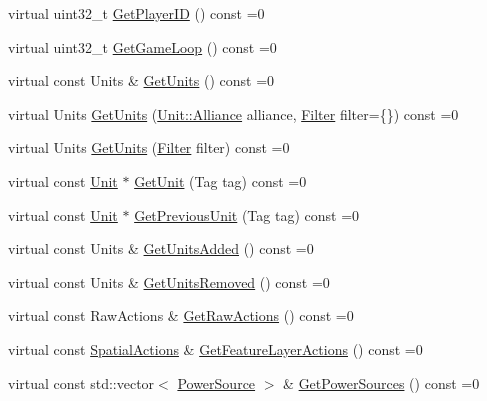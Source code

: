 \begin{DoxyCompactItemize}
\item 
virtual uint32\+\_\+t \hyperlink{classsc2_1_1_observation_interface_a21c3f197fe6578e63ef6b2eaa2be082c}{Get\+Player\+ID} () const =0
\item 
virtual uint32\+\_\+t \hyperlink{classsc2_1_1_observation_interface_a19d85546124654418d00b736f0146218}{Get\+Game\+Loop} () const =0
\item 
virtual const Units \& \hyperlink{classsc2_1_1_observation_interface_ab08e71ba04b19d3b4048ce9da6838e00}{Get\+Units} () const =0
\item 
virtual Units \hyperlink{classsc2_1_1_observation_interface_aa43cfa17a9ac893500bce33eb41e6171}{Get\+Units} (\hyperlink{classsc2_1_1_unit_a5a40e672e7599d73ef8ef5758bbd7461}{Unit\+::\+Alliance} alliance, \hyperlink{sc2__interfaces_8h_af4abbeea3291e718cf2283e1390f3670}{Filter} filter=\{\}) const =0
\item 
virtual Units \hyperlink{classsc2_1_1_observation_interface_ab0d22edc6bd276b8e9d27387294fdc88}{Get\+Units} (\hyperlink{sc2__interfaces_8h_af4abbeea3291e718cf2283e1390f3670}{Filter} filter) const =0
\item 
virtual const \hyperlink{classsc2_1_1_unit}{Unit} $\ast$ \hyperlink{classsc2_1_1_observation_interface_a0f766e5a6522a6966b4d2abf0a2daff2}{Get\+Unit} (Tag tag) const =0
\item 
virtual const \hyperlink{classsc2_1_1_unit}{Unit} $\ast$ \hyperlink{classsc2_1_1_observation_interface_a59684d8b385941931e6175800eb4bbdb}{Get\+Previous\+Unit} (Tag tag) const =0
\item 
virtual const Units \& \hyperlink{classsc2_1_1_observation_interface_a30cdffc5d5c87797c5c154fe50bad768}{Get\+Units\+Added} () const =0
\item 
virtual const Units \& \hyperlink{classsc2_1_1_observation_interface_a656f51b87f1fafeeff37206345793476}{Get\+Units\+Removed} () const =0
\item 
virtual const Raw\+Actions \& \hyperlink{classsc2_1_1_observation_interface_aa247d650d50d3d1bfe81642df96b1360}{Get\+Raw\+Actions} () const =0
\item 
virtual const \hyperlink{structsc2_1_1_spatial_actions}{Spatial\+Actions} \& \hyperlink{classsc2_1_1_observation_interface_a1e0b5b6e6e6ce0a879c1854b696dcdb0}{Get\+Feature\+Layer\+Actions} () const =0
\item 
virtual const std\+::vector$<$ \hyperlink{structsc2_1_1_power_source}{Power\+Source} $>$ \& \hyperlink{classsc2_1_1_observation_interface_abf25ada67444ace346e57c1ad367ca8e}{Get\+Power\+Sources} () const =0

\end{DoxyCompactItemize}
